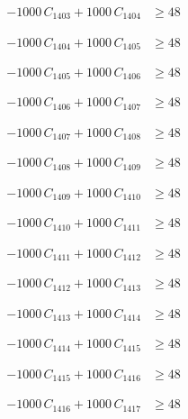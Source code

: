 \documentclass[a4paper,11pt]{article}
\begin{document}
\begin{align}
-1000\,C_{1403} + 1000\,C_{1404} &\geq 48 \nonumber
\end{align}

\begin{align}
-1000\,C_{1404} + 1000\,C_{1405} &\geq 48 \nonumber
\end{align}

\begin{align}
-1000\,C_{1405} + 1000\,C_{1406} &\geq 48 \nonumber
\end{align}

\begin{align}
-1000\,C_{1406} + 1000\,C_{1407} &\geq 48 \nonumber
\end{align}

\begin{align}
-1000\,C_{1407} + 1000\,C_{1408} &\geq 48 \nonumber
\end{align}

\begin{align}
-1000\,C_{1408} + 1000\,C_{1409} &\geq 48 \nonumber
\end{align}

\begin{align}
-1000\,C_{1409} + 1000\,C_{1410} &\geq 48 \nonumber
\end{align}

\begin{align}
-1000\,C_{1410} + 1000\,C_{1411} &\geq 48 \nonumber
\end{align}

\begin{align}
-1000\,C_{1411} + 1000\,C_{1412} &\geq 48 \nonumber
\end{align}

\begin{align}
-1000\,C_{1412} + 1000\,C_{1413} &\geq 48 \nonumber
\end{align}

\begin{align}
-1000\,C_{1413} + 1000\,C_{1414} &\geq 48 \nonumber
\end{align}

\begin{align}
-1000\,C_{1414} + 1000\,C_{1415} &\geq 48 \nonumber
\end{align}

\begin{align}
-1000\,C_{1415} + 1000\,C_{1416} &\geq 48 \nonumber
\end{align}

\begin{align}
-1000\,C_{1416} + 1000\,C_{1417} &\geq 48 \nonumber
\end{align}
\end{document}

